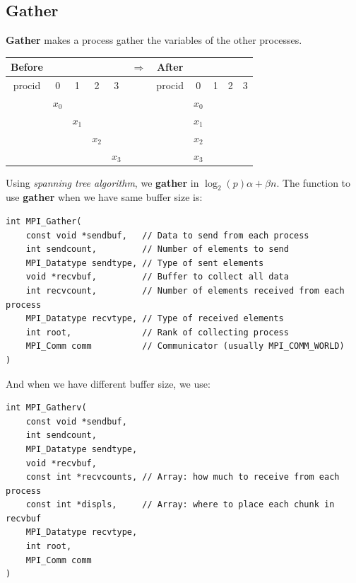 \documentclass[12pt, openany]{report}
\theoremstyle{definition}
\begin{document}
\subsection{Gather}
\textbf{Gather} makes a process gather the variables of the other processes.\\
\begin{center}
	\begin{tabular}{ccccc|c|ccccc}
		Before &&&&& $\Longrightarrow$ &After&&&&\\
		\hline
		procid & 0 & 1 & 2 & 3 & & procid & 0 & 1 & 2 & 3\\
		\hline
		& $x_0$ &&&&& & $x_0$ &&&\\
		&& $x_1$ &&&& & $x_1$ &&&\\
		&&& $x_2$ &&& & $x_2$ &&&\\
		&&&& $x_3$ && & $x_3$ &&&\\
		\hline
	\end{tabular}
\end{center}
Using \textit{spanning tree algorithm}, we \textbf{gather} in $\log_2(p)\alpha + \beta n$. The function to use \textbf{gather} when we have same buffer size is:
\begin{lstlisting}[style=CppStyle]
int MPI_Gather(
    const void *sendbuf,   // Data to send from each process
    int sendcount,         // Number of elements to send
    MPI_Datatype sendtype, // Type of sent elements
    void *recvbuf,         // Buffer to collect all data
    int recvcount,         // Number of elements received from each process
    MPI_Datatype recvtype, // Type of received elements
    int root,              // Rank of collecting process
    MPI_Comm comm          // Communicator (usually MPI_COMM_WORLD)
)
\end{lstlisting}
And when we have different buffer size, we use:
\begin{lstlisting}[style=CppStyle]
int MPI_Gatherv(
    const void *sendbuf,
    int sendcount,
    MPI_Datatype sendtype,
    void *recvbuf,
    const int *recvcounts, // Array: how much to receive from each process
    const int *displs,     // Array: where to place each chunk in recvbuf
    MPI_Datatype recvtype,
    int root,
    MPI_Comm comm
)
\end{lstlisting}
\end{document}
